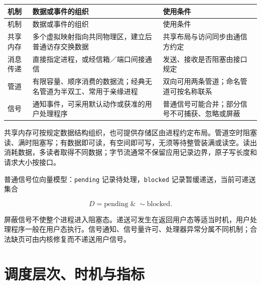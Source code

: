 \par\smallskip
\begin{wideblock}
{\fontsize{9.3}{12}\selectfont\setlength{\tabcolsep}{2.5pt}\setlength{\LTleft}{0pt}\setlength{\LTright}{0pt}
\begin{longtable}{@{}>{\raggedright\arraybackslash}p{}>{\raggedright\arraybackslash}p{}>{\raggedright\arraybackslash}p{}@{}}
\toprule
机制 & 数据或事件的组织 & 使用条件 \\

\midrule\endfirsthead\toprule
机制 & 数据或事件的组织 & 使用条件 \\

\midrule\endhead\bottomrule\endfoot
共享内存 & 多个虚拟映射指向共同物理区，建立后普通访存交换数据 & 共享布局与访问同步由通信方约定 \\

消息传递 & 直接指定进程，或经信箱／端口间接通信 & 发送、接收是否阻塞由接口规定 \\

管道 & 有限容量、顺序消费的数据流；经典无名管道为半双工、常用于亲缘进程 & 双向可用两条管道；命名管道可按名称联系 \\

信号 & 通知事件，可采用默认动作或获准的用户处理程序 & 普通信号可能合并；部分信号不可捕获、忽略或屏蔽 \\

\end{longtable}}
\end{wideblock}
\par\smallskip

共享内存可按规定数据结构组织，也可提供存储区由进程约定布局。管道空时阻塞读、满时阻塞写；有数据即可读，有空间即可写，无须等待整管装满或读空。读出消耗数据，多读者取得不同数据；字节流通常不保留应用记录边界，原子写长度和请求大小按接口。

普通信号位向量模型：\texttt{pending} 记录待处理，\texttt{blocked} 记录暂缓递送，当前可递送集合

\[D=\mathrm{pending}\;\&\;\sim\mathrm{blocked}.\]

屏蔽信号不使整个进程进入阻塞态。递送可发生在返回用户态等适当时机，用户处理程序一般在用户态执行。信号通知、信号量许可、处理器异常分属不同机制；合法缺页可由内核修复而不递送用户信号。

\section{调度层次、时机与指标}\label{OS02-scheduling-metrics}

